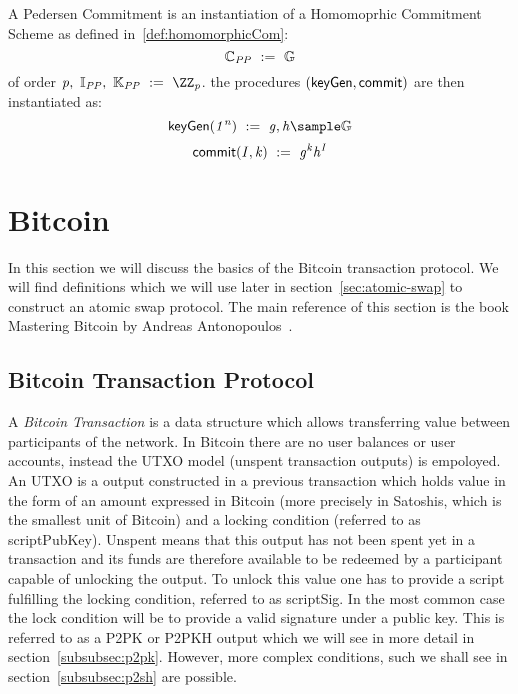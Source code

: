 \begin{definition}\label{def:pedersenCom}
    A Pedersen Commitment is an instantiation of a Homomoprhic Commitment Scheme as defined in~\ref{def:homomorphicCom}:
    \[ \mathbb{C}_{\mathit{PP}} ~:=~ \mathbb{G}\] of order $\varPrime \opSeperate \varInputSpace_{\varPublicParam} \opSeperate \varRandSpace_{\varPublicParam} \opAssign \cnstIntegersPrime{\varPrime}$.
    the procedures $(\mathsf{keyGen}, \mathsf{commit})$ are then instantiated as:
    \[ \procSetup{\varSecParam} \opAssign \varG, \varH \sample \cnstGroup\]
    \[ \mathsf{commit}(\mathit{I}, \mathit{k}) ~:=~ \mathit{g}^{\mathit{k}} \mathit{h}^{\mathit{I}} \]

\end{definition}


\section{Bitcoin}\label{sec:bitcoin}

In this section we will discuss the basics of the Bitcoin transaction protocol.
We will find definitions which we will use later in section~\ref{sec:atomic-swap} to construct an atomic swap protocol.
The main reference of this section is the book Mastering Bitcoin by Andreas Antonopoulos~\cite{antonopoulos2014mastering}.

\subsection{Bitcoin Transaction Protocol}\label{subsec:bitcointx}

A \emph{Bitcoin Transaction} is a data structure which allows transferring value between participants of the network.
In Bitcoin there are no user balances or user accounts, instead the UTXO model (unspent transaction outputs) is empoloyed.
An UTXO is a output constructed in a previous transaction which holds value in the form of an amount expressed in
Bitcoin (more precisely in Satoshis, which is the smallest unit of Bitcoin) and a locking condition (referred to as
scriptPubKey).
Unspent means that this output has not been spent yet in a transaction and its funds are therefore available to be redeemed by a participant capable of unlocking the output.
To unlock this value one has to provide a script fulfilling the locking condition, referred to as scriptSig.
In the most common case the lock condition will be to provide a valid signature under a public key.
This is referred to as a P2PK or P2PKH output which we will see in more detail in section~\ref{subsubsec:p2pk}.
However, more complex conditions, such we shall see in section~\ref{subsubsec:p2sh} are possible.

